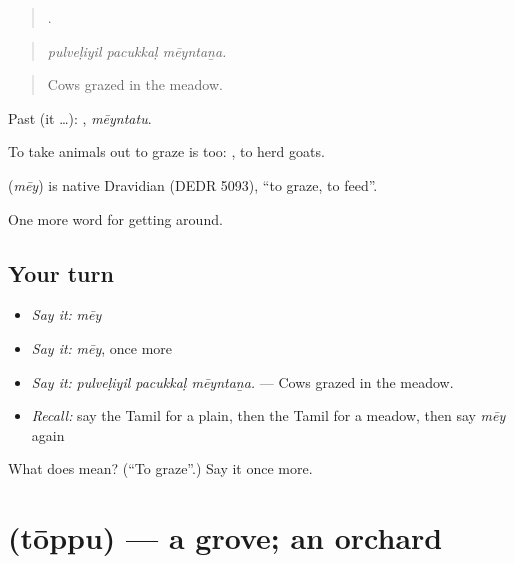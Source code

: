 \begin{quote}
  .
\end{quote}

\begin{quote}
\emph{pulveḷiyil pacukkaḷ mēyntaṉa.}
\end{quote}

\begin{quote}
Cows grazed in the meadow.
\end{quote}

Past (it …): , \emph{mēyntatu}.

To take animals out to graze is  too:  , to herd goats.

\begin{cousinweb}
\textbf{} (\emph{mēy}) is native Dravidian (DEDR 5093), \textquotedblleft{}to graze, to feed\textquotedblright{}.
\end{cousinweb}

\begin{grammarlens}[title={What you've built}]
One more word for getting around.
\end{grammarlens}

\subsection*{Your turn}
\begin{itemize}
\raggedright
  \item \emph{Say it:} \emph{mēy}
  \item \emph{Say it:} \emph{mēy}, once more
  \item \emph{Say it:} \emph{pulveḷiyil pacukkaḷ mēyntaṉa.} — Cows grazed in the meadow.
  \item \emph{Recall:} say the Tamil for a plain, then the Tamil for a meadow, then say \emph{mēy} again
\end{itemize}

\begin{tcolorbox}[breakable,colback=teal!4,colframe=teal!35!black,title={Before you move on}]
What does  mean? (\textquotedblleft{}To graze\textquotedblright{}.) Say it once more.
\end{tcolorbox}
\section[\texorpdfstring{\ta{தோப்பு} (tōppu)}{தோப்பு (tōppu)}]{ (tōppu) — a grove; an orchard}


